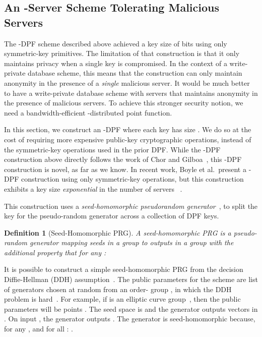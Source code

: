\documentclass[10pt,twocolumn]{article}
\newtheorem{defn}{Definition}
\begin{document}
\subsection{An -Server Scheme Tolerating  Malicious Servers}
\label{sec:dpf:manyserver}

The -DPF scheme described above 
achieved a key size of  bits using only 
symmetric-key primitives.
The limitation of that construction is that it only
maintains privacy when a single key is compromised.
In the context of a write-private database scheme, this
means that the construction 
can only maintain anonymity in the presence
of a {\em single} malicious server.
It would be much better to have a write-private database 
scheme with  servers that maintains anonymity in the
presence of  malicious servers.
To achieve this stronger security notion, we need a
bandwidth-efficient
-distributed point function.

In this section, we construct an -DPF
where each key has size .
We do so at the cost of requiring more expensive 
public-key cryptographic operations, 
instead of the symmetric-key operations used
in the prior DPF.
While the -DPF construction above
directly follows the work of Chor and Gilboa~\cite{chor1997computationally},
this -DPF construction is novel, as far as we know.
In recent work, Boyle et al.~present a -DPF construction using only symmetric-key 
operations, but this construction exhibits a key size {\em exponential} in 
the number of servers ~\cite{boyle2015function}.

\medskip

This construction uses
a \textit{seed-homomorphic pseudorandom 
generator}~\cite{banerjee2014new,boneh2013key,naor1999distributed},
to split the key for the pseudo-random generator  across
a collection of  DPF keys.

\begin{defn}[Seed-Homomorphic PRG]
A {\em seed-homomorphic} PRG is a pseudo-random generator
 mapping seeds in a group
 to outputs in a group  
with the additional property that for any :

\end{defn}

It is possible to construct a simple seed-homomorphic PRG from the decision
Diffie-Hellman (DDH) assumption~\cite{boneh2013key,naor1999distributed}.
The public parameters for the scheme are 
list of  generators chosen at random from an order- 
group , in which the DDH problem is hard~\cite{boneh1998decision}.
For example, if  is an elliptic curve group~\cite{miller1986use},
then the public parameters will be  points .
The seed space is  and the generator
outputs vectors in .
On input , the generator outputs
.
The generator is seed-homomorphic because,
for any , and for
all : 
. 
\end{document}
